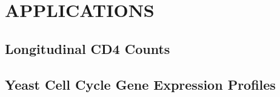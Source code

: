 \documentclass[11pt]{report}
\begin{document}
\section{APPLICATIONS}

\subsection*{Longitudinal CD4 Counts}

\subsection*{Yeast Cell Cycle Gene Expression Profiles}
\end{document}
